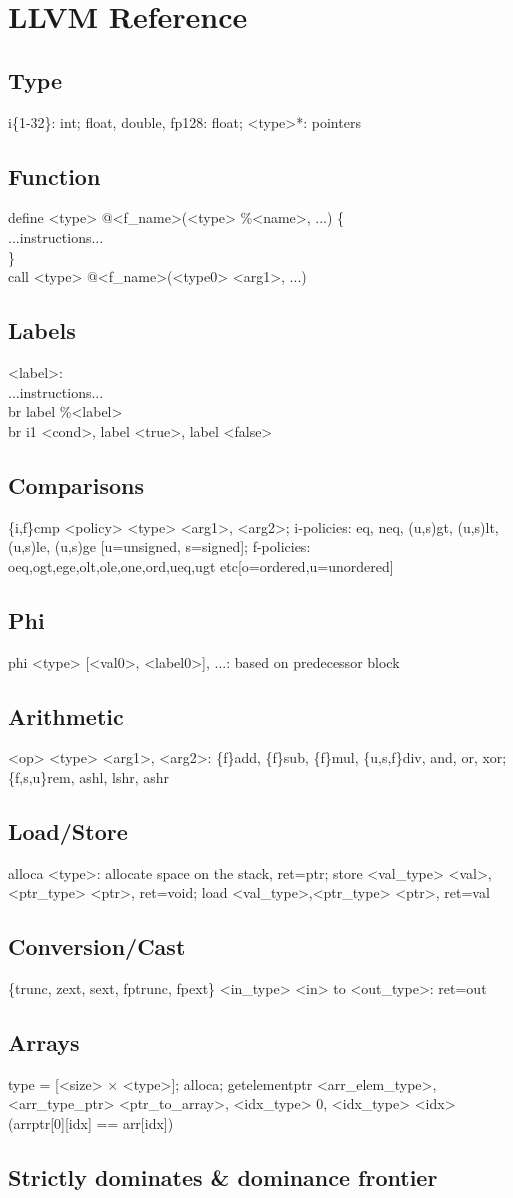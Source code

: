 \section{LLVM Reference}
\subsection*{Type}
i\{1-32\}: int; float, double, fp128: float; <type>*: pointers
\subsection*{Function}
define <type> @<f\_name>(<type> \%<name>, ...) \{\\
...instructions...\\
\}\\
call <type> @<f\_name>(<type0> <arg1>, ...)
\subsection*{Labels}
<label>:\\
...instructions...\\
br label \%<label>\\
br i1 <cond>, label <true>, label <false>
\subsection*{Comparisons}
\{i,f\}cmp <policy> <type> <arg1>, <arg2>; i-policies: eq, neq, (u,s)gt, (u,s)lt, (u,s)le, (u,s)ge [u=unsigned, s=signed]; f-policies: oeq,ogt,ege,olt,ole,one,ord,ueq,ugt etc[o=ordered,u=unordered]
\subsection*{Phi}
phi <type> [<val0>, <label0>], ...: based on predecessor block
\subsection*{Arithmetic}
<op> <type> <arg1>, <arg2>: \{f\}add, \{f\}sub, \{f\}mul, \{u,s,f\}div, and, or, xor;\{f,s,u\}rem, ashl, lshr, ashr
\subsection*{Load/Store}
alloca <type>: allocate space on the stack, ret=ptr; store <val\_type> <val>, <ptr\_type> <ptr>, ret=void; load <val\_type>,<ptr\_type> <ptr>, ret=val
\subsection*{Conversion/Cast}
\{trunc, zext, sext, fptrunc, fpext\} <in\_type> <in> to <out\_type>: ret=out
\subsection*{Arrays}
type = [<size> $\times$ <type>]; alloca; getelementptr <arr\_elem\_type>, <arr\_type\_ptr>
<ptr\_to\_array>, <idx\_type> 0, <idx\_type> <idx> (arrptr[0][idx] == arr[idx])
\subsection*{Strictly dominates \& dominance frontier}
